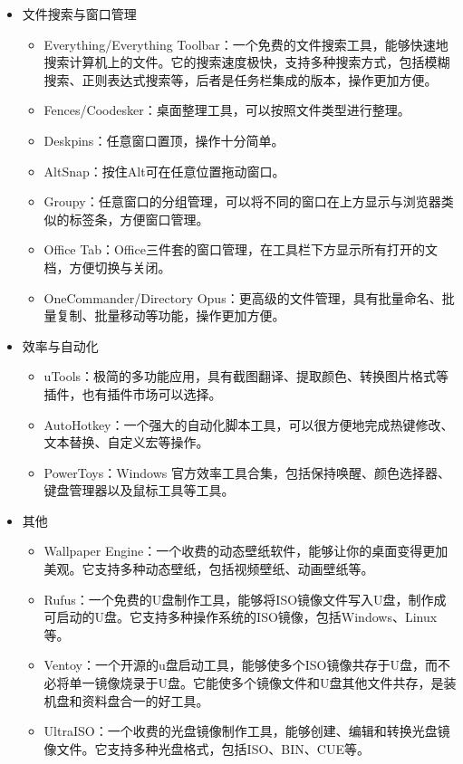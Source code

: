 \begin{itemize}
\begin{itemize}
    \end{itemize}
  \item 文件搜索与窗口管理
    \begin{itemize}
      \item Everything/Everything Toolbar：一个免费的文件搜索工具，能够快速地搜索计算机上的文件。它的搜索速度极快，支持多种搜索方式，包括模糊搜索、正则表达式搜索等，后者是任务栏集成的版本，操作更加方便。
      \item Fences/Coodesker：桌面整理工具，可以按照文件类型进行整理。
      \item Deskpins：任意窗口置顶，操作十分简单。
      \item AltSnap：按住Alt可在任意位置拖动窗口。
      \item Groupy：任意窗口的分组管理，可以将不同的窗口在上方显示与浏览器类似的标签条，方便窗口管理。
      \item Office Tab：Office三件套的窗口管理，在工具栏下方显示所有打开的文档，方便切换与关闭。
      \item OneCommander/Directory Opus：更高级的文件管理，具有批量命名、批量复制、批量移动等功能，操作更加方便。
    \end{itemize}
  \item 效率与自动化
    \begin{itemize}
      \item uTools：极简的多功能应用，具有截图翻译、提取颜色、转换图片格式等插件，也有插件市场可以选择。
      \item AutoHotkey：一个强大的自动化脚本工具，可以很方便地完成热键修改、文本替换、自定义宏等操作。
      \item PowerToys：Windows 官方效率工具合集，包括保持唤醒、颜色选择器、键盘管理器以及鼠标工具等工具。
    \end{itemize}
  \item 其他
    \begin{itemize}
      \item Wallpaper Engine：一个收费的动态壁纸软件，能够让你的桌面变得更加美观。它支持多种动态壁纸，包括视频壁纸、动画壁纸等。
      \item Rufus：一个免费的U盘制作工具，能够将ISO镜像文件写入U盘，制作成可启动的U盘。它支持多种操作系统的ISO镜像，包括Windows、Linux等。
      \item Ventoy：一个开源的u盘启动工具，能够使多个ISO镜像共存于U盘，而不必将单一镜像烧录于U盘。它能使多个镜像文件和U盘其他文件共存，是装机盘和资料盘合一的好工具。
      \item UltraISO：一个收费的光盘镜像制作工具，能够创建、编辑和转换光盘镜像文件。它支持多种光盘格式，包括ISO、BIN、CUE等。

\end{itemize}
\end{itemize}
